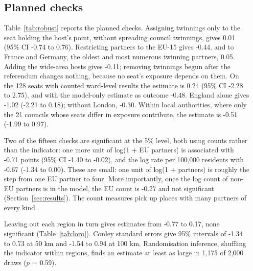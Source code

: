 \documentclass[11pt,a4paper]{article}
\begin{document}
\subsection{Planned checks}
Table~\ref{tab:robust} reports the planned checks. Assigning twinnings only to the seat holding the host's point, without spreading council twinnings, gives 0.01 (95\% CI -0.74 to 0.76). Restricting partners to the EU-15 gives -0.44, and to France and Germany, the oldest and most numerous twinning partners, 0.05. Adding the wide-area hosts gives -0.11; removing twinnings begun after the referendum changes nothing, because no seat's exposure depends on them. On the 128 seats with counted ward-level results the estimate is 0.24 (95\% CI -2.28 to 2.75), and with the model-only estimate as outcome -0.48. England alone gives -1.02 (-2.21 to 0.18); without London, -0.30. Within local authorities, where only the 21 councils whose seats differ in exposure contribute, the estimate is -0.51 (-1.99 to 0.97).

Two of the fifteen checks are significant at the 5\% level, both using counts rather than the indicator: one more unit of log(1 + EU partners) is associated with -0.71 points (95\% CI -1.40 to -0.02), and the log rate per 100,000 residents with -0.67 (-1.34 to 0.00). These are small: one unit of log(1 + partners) is roughly the step from one EU partner to four. More importantly, once the log count of non-EU partners is in the model, the EU count is -0.27 and not significant (Section~\ref{sec:results}). The count measures pick up places with many partners of every kind.

Leaving out each region in turn gives estimates from -0.77 to 0.17, none significant (Table~\ref{tab:loro}). Conley standard errors give 95\% intervals of -1.34 to 0.73 at 50 km and -1.54 to 0.94 at 100 km. Randomisation inference, shuffling the indicator within regions, finds an estimate at least as large in 1,175 of 2,000 draws ($p$ = 0.59).
\end{document}
